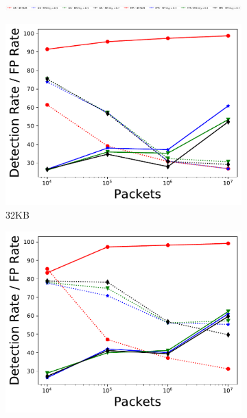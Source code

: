 \begin{figure}[p]
\begin{subfigure}[t]{\textwidth}
    \includegraphics[width=\linewidth]{figures/legend.png}    
\end{subfigure}

\begin{subfigure}[t]{0.32\textwidth}
    \includegraphics[width=\linewidth]{figures/DR_FPR_per_pkts_m=0.03125.pdf}
    \caption{32KB}
    \label{fig:fig2_a}    
\end{subfigure}\hfill
\begin{subfigure}[t]{0.32\textwidth}
    \includegraphics[width=\linewidth]{figures/DR_FPR_per_pkts_m=0.0625.pdf}

\end{subfigure}
\end{figure}
